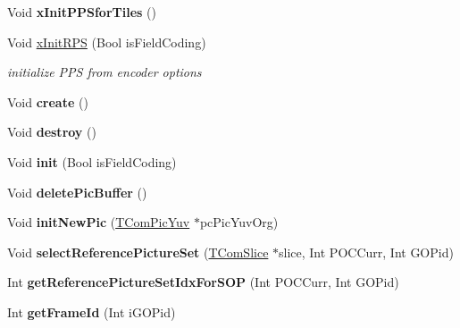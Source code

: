 \begin{DoxyCompactItemize}
\mbox{\label{class_t_enc_top_aac418327dc5b763ec567599d32d294b9}} 
Void {\bfseries x\+Init\+P\+P\+Sfor\+Tiles} ()
\item 
\mbox{\label{class_t_enc_top_a3cf6e19a44ae47ef0737b24911f22e13}} 
Void \hyperlink{class_t_enc_top_a3cf6e19a44ae47ef0737b24911f22e13}{x\+Init\+R\+PS} (Bool is\+Field\+Coding)
\begin{DoxyCompactList}\small\item\em initialize P\+PS from encoder options \end{DoxyCompactList}\item 
\mbox{\label{class_t_enc_top_a571ddd80235eb73ff33a997da81b2cd4}} 
Void {\bfseries create} ()
\item 
\mbox{\label{class_t_enc_top_a414a824f637c3ba139067d502f5ba10e}} 
Void {\bfseries destroy} ()
\item 
\mbox{\label{class_t_enc_top_ace5604f261c3fc34d5cbb726e5e34d36}} 
Void {\bfseries init} (Bool is\+Field\+Coding)
\item 
\mbox{\label{class_t_enc_top_a3b676ccb9c3ae4cba0eaff4d7f922feb}} 
Void {\bfseries delete\+Pic\+Buffer} ()
\item 
\mbox{\label{class_t_enc_top_acb475e42d6aeb71aaee314330de09af8}} 
Void {\bfseries init\+New\+Pic} (\hyperlink{class_t_com_pic_yuv}{T\+Com\+Pic\+Yuv} $\ast$pc\+Pic\+Yuv\+Org)
\item 
\mbox{\label{class_t_enc_top_a2bdccb7106a3d605a9fdcb6397dd5098}} 
Void {\bfseries select\+Reference\+Picture\+Set} (\hyperlink{class_t_com_slice}{T\+Com\+Slice} $\ast$slice, Int P\+O\+C\+Curr, Int G\+O\+Pid)
\item 
\mbox{\label{class_t_enc_top_a92e6ec2cb71a7702ff2174b43edac6ce}} 
Int {\bfseries get\+Reference\+Picture\+Set\+Idx\+For\+S\+OP} (Int P\+O\+C\+Curr, Int G\+O\+Pid)
\item 
\mbox{\label{class_t_enc_top_aaf52a452f860f5d08d9a42927ed0ed6b}} 
Int {\bfseries get\+Frame\+Id} (Int i\+G\+O\+Pid)

\end{DoxyCompactItemize}
